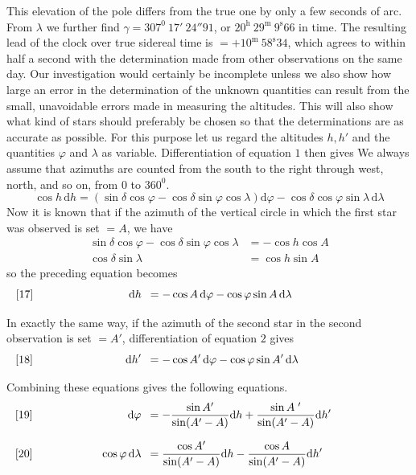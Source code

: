 This elevation of the pole differs from the true one by only a few seconds of arc. From $\lambda$ we further find $\gamma=307^0\ 17'\ 24''91$, or $20^{\mathrm h}\ 29^{\mathrm m}\ 9^{\mathrm s}66$ in time. The resulting lead of the clock over true sidereal time is $=+10^{\mathrm m}\ 58^{\mathrm s}34$, which agrees to within half a second with the determination made from other observations on the same day.
Our investigation would certainly be incomplete unless we also show how large an error in the determination of the unknown quantities can result from the small, unavoidable errors made in measuring the altitudes. This will also show what kind of stars should preferably be chosen so that the determinations are as accurate as possible. For this purpose let us regard the altitudes $h,h'$ and the quantities $\varphi$ and $\lambda$ as variable. Differentiation of equation $1$ then gives
\expandafter\def\csname HistoricalNoteText1\endcsname{We always assume that azimuths are counted from the south to the right through west, north, and so on, from $0$ to $360^0$.}
\begingroup
\newcommand{\GaussVIPoliDifferential}[3]{%
  \[\makebox[\linewidth][l]{%
    \makebox[0pt][l]{[#1]}%
    \makebox[.325\linewidth][r]{$\displaystyle #2$}\enspace
    $\displaystyle {}=#3$}\]%
}
\[
\cos h\,\mathrm dh=(\sin\delta\cos\varphi-\cos\delta\sin\varphi\cos\lambda)\mathrm d\varphi-\cos\delta\cos\varphi\sin\lambda\,\mathrm d\lambda
\]
Now it is known that if the azimuth of the vertical circle in which the first star was observed is set $=A$, we have
\[
\begin{aligned}
\sin\delta\cos\varphi-\cos\delta\sin\varphi\cos\lambda&=-\cos h\cos A\\
\cos\delta\sin\lambda&=\cos h\sin A
\end{aligned}
\]
so the preceding equation becomes
\GaussVIPoliDifferential{17}{\mathrm dh}{-\cos A\,\mathrm d\varphi-\cos\varphi\sin A\,\mathrm d\lambda}
In exactly the same way, if the azimuth of the second star in the second observation is set $=A'$, differentiation of equation $2$ gives
\GaussVIPoliDifferential{18}{\mathrm dh'}{-\cos A'\,\mathrm d\varphi-\cos\varphi\sin A'\,\mathrm d\lambda}
Combining these equations gives the following equations.
\GaussVIPoliDifferential{19}{\mathrm d\varphi}{-\frac{\sin A'}{\sin(A'-A)}\mathrm dh+\frac{\sin A\;{}'}{\sin(A'-A)}\mathrm dh'}
\GaussVIPoliDifferential{20}{\cos\varphi\,\mathrm d\lambda}{\frac{\cos A'}{\sin(A'-A)}\mathrm dh-\frac{\cos A}{\sin(A'-A)}\mathrm dh'}
\endgroup

